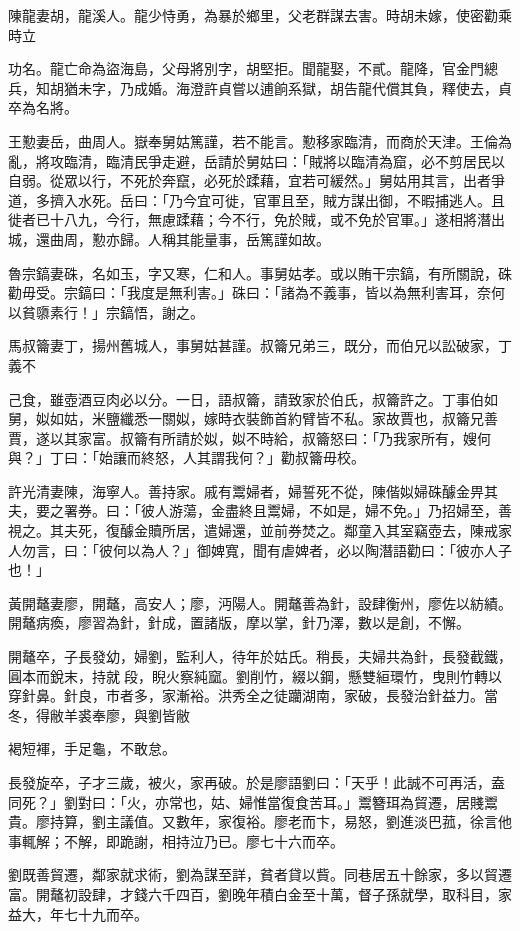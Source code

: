 \begin{pinyinscope}
陳龍妻胡，龍溪人。龍少恃勇，為暴於鄉里，父老群謀去害。時胡未嫁，使密勸乘時立

功名。龍亡命為盜海島，父母將別字，胡堅拒。聞龍娶，不貳。龍降，官金門總兵，知胡猶未字，乃成婚。海澄許貞嘗以逋餉系獄，胡告龍代償其負，釋使去，貞卒為名將。

王懃妻岳，曲周人。嶽奉舅姑篤謹，若不能言。懃移家臨清，而商於天津。王倫為亂，將攻臨清，臨清民爭走避，岳請於舅姑曰：「賊將以臨清為窟，必不剪居民以自弱。從眾以行，不死於奔竄，必死於蹂藉，宜若可緩然。」舅姑用其言，出者爭道，多擠入水死。岳曰：「乃今宜可徙，官軍且至，賊方謀出御，不暇捕逃人。且徙者已十八九，今行，無慮蹂藉；今不行，免於賊，或不免於官軍。」遂相將潛出城，還曲周，懃亦歸。人稱其能量事，岳篤謹如故。

魯宗鎬妻硃，名如玉，字又寒，仁和人。事舅姑孝。或以賄干宗鎬，有所關說，硃勸毋受。宗鎬曰：「我度是無利害。」硃曰：「諸為不義事，皆以為無利害耳，奈何以貧隳素行！」宗鎬悟，謝之。

馬叔籥妻丁，揚州舊城人，事舅姑甚謹。叔籥兄弟三，既分，而伯兄以訟破家，丁義不

己食，雖壺酒豆肉必以分。一日，語叔籥，請致家於伯氏，叔籥許之。丁事伯如舅，姒如姑，米鹽纖悉一關姒，嫁時衣裝飾首約臂皆不私。家故賈也，叔籥兄善賈，遂以其家富。叔籥有所請於姒，姒不時給，叔籥怒曰：「乃我家所有，嫂何與？」丁曰：「始讓而終怒，人其謂我何？」勸叔籥毋校。

許光清妻陳，海寧人。善持家。戚有鬻婦者，婦誓死不從，陳偕姒婦硃醵金畀其夫，要之署券。曰：「彼人游蕩，金盡終且鬻婦，不如是，婦不免。」乃招婦至，善視之。其夫死，復醵金贖所居，遣婦還，並前券焚之。鄰童入其室竊壺去，陳戒家人勿言，曰：「彼何以為人？」御婢寬，聞有虐婢者，必以陶潛語勸曰：「彼亦人子也！」

黃開鼇妻廖，開鼇，高安人；廖，沔陽人。開鼇善為針，設肆衡州，廖佐以紡績。開鼇病瘓，廖習為針，針成，置諸版，摩以掌，針乃澤，數以是創，不懈。

開鼇卒，子長發幼，婦劉，監利人，待年於姑氏。稍長，夫婦共為針，長發截鐵，圓本而銳末，持就段，睨火察純窳。劉削竹，綴以鋼，懸雙絙環竹，曳則竹轉以穿針鼻。針良，市者多，家漸裕。洪秀全之徒躪湖南，家破，長發治針益力。當冬，得敝羊裘奉廖，與劉皆敝

褐短褌，手足龜，不敢怠。

長發旋卒，子才三歲，被火，家再破。於是廖語劉曰：「天乎！此誠不可再活，盍同死？」劉對曰：「火，亦常也，姑、婦惟當復食苦耳。」鬻簪珥為貿遷，居賤鬻貴。廖持算，劉主議值。又數年，家復裕。廖老而卞，易怒，劉進淡巴菰，徐言他事輒解；不解，即跪謝，相持泣乃已。廖七十六而卒。

劉既善貿遷，鄰家就求術，劉為謀至詳，貧者貸以貲。同巷居五十餘家，多以貿遷富。開鼇初設肆，才錢六千四百，劉晚年積白金至十萬，督子孫就學，取科目，家益大，年七十九而卒。


\end{pinyinscope}
